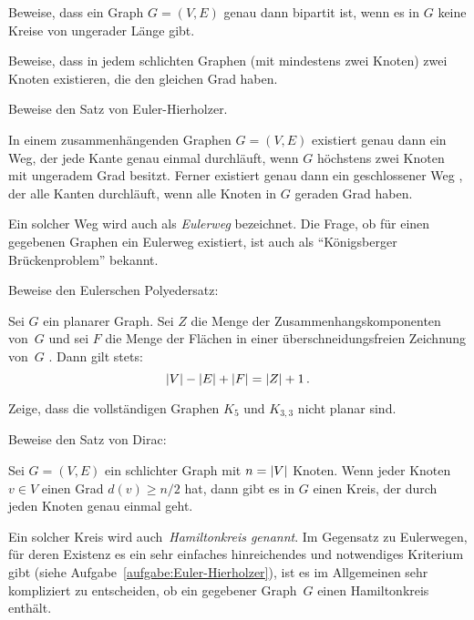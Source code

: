 \begin{aufgabe*}\label{aufgabe:Bipartit}
	Beweise, dass ein Graph $G=(V,E)$ genau dann bipartit ist, wenn es in $G$ keine Kreise von ungerader Länge gibt.
\end{aufgabe*}
\begin{aufgabe*}\label{aufgabe:Schlicht}
	Beweise, dass in jedem schlichten Graphen (mit mindestens zwei Knoten) zwei Knoten existieren, die den gleichen Grad haben.
\end{aufgabe*}
\begin{aufgabe*}[*]\label{aufgabe:Euler-Hierholzer}
	Beweise den Satz von Euler-Hierholzer.
	\begin{satzmitnamen}
		In einem zusammenhängenden Graphen $G=(V,E)$ existiert genau dann ein Weg, der jede Kante genau einmal durchläuft, wenn $G$ höchstens zwei Knoten mit ungeradem Grad besitzt. Ferner existiert genau dann ein geschlossener Weg , der alle Kanten durchläuft, wenn alle Knoten in $G$ geraden Grad haben.
	\end{satzmitnamen}
\end{aufgabe*}

Ein solcher Weg wird auch als \emph{Eulerweg} bezeichnet. Die Frage, ob für einen gegebenen Graphen ein Eulerweg existiert, ist auch als \enquote{Königsberger Brückenproblem} bekannt. 

\begin{aufgabe*}[*]\label{aufgabe:Polyeder}
	Beweise den Eulerschen Polyedersatz:
	\begin{satzmitnamen}
		Sei $G$ ein planarer Graph. Sei $Z$ die Menge der Zusammenhangskomponenten von~$G$ und sei $F$ die Menge der Flächen in einer überschneidungsfreien Zeichnung von~$G$ . Dann gilt stets:
		\begin{equation*}
			\abs{V}-\abs{E}+\abs*{F} = \abs*{Z}+1\,.
		\end{equation*}
	\end{satzmitnamen}
\end{aufgabe*}
\begin{aufgabe*}[*]\label{aufgabe:Unplanar}
	Zeige, dass die vollständigen Graphen $K_5$ und $K_{3,3}$ nicht planar sind.
\end{aufgabe*}
\begin{aufgabe*}[**]\label{aufgabe:Dirac}
	Beweise den Satz von Dirac:
	\begin{satzmitnamen}
		Sei $G=(V,E)$ ein schlichter Graph mit $n=\abs*{V}$ Knoten. Wenn jeder Knoten $v\in V$ einen Grad $d(v)\geqslant n/2$ hat, dann gibt es in $G$ einen Kreis, der durch jeden Knoten genau einmal geht.
	\end{satzmitnamen}
\end{aufgabe*}
Ein solcher Kreis wird auch~\emph{Hamiltonkreis genannt}. Im Gegensatz zu Eulerwegen, für deren Existenz es ein sehr einfaches hinreichendes und notwendiges Kriterium gibt (siehe Aufgabe~\ref{aufgabe:Euler-Hierholzer}), ist es im Allgemeinen sehr kompliziert zu entscheiden, ob ein gegebener Graph~$G$ einen Hamiltonkreis enthält.

